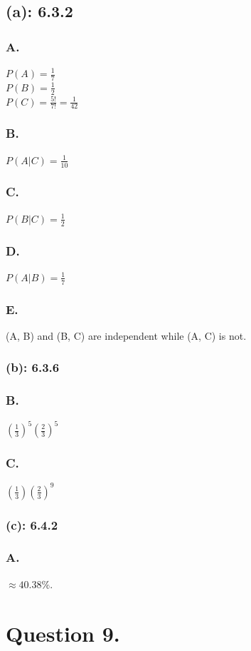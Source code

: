 \documentclass[titlepage]{article}\pagestyle{empty}
\begin{document}
\subsection*{(a): 6.3.2}
\subsubsection*{A.} $P(A) = \frac{1}{7}$\\$P(B) = \frac{1}{2}$\\$P(C) = \frac{5!}{7!} = \frac{1}{42}$
\subsubsection*{B.} $P(A|C) = \frac{1}{10}$
\subsubsection*{C.} $P(B|C) = \frac{1}{2}$
\subsubsection*{D.} $P(A|B) = \frac{1}{7}$
\subsubsection*{E.} (A, B) and (B, C) are independent while (A, C) is not.
\subsubsection*{(b): 6.3.6}
\subsubsection*{B.} $(\frac{1}{3})^5 (\frac{2}{3})^5$
\subsubsection*{C.} $(\frac{1}{3})(\frac{2}{3})^9$
\subsubsection*{(c): 6.4.2}
\subsubsection*{A.} $\approx 40.38\%$.

\pagebreak
\section*{Question 9.}
\end{document}
